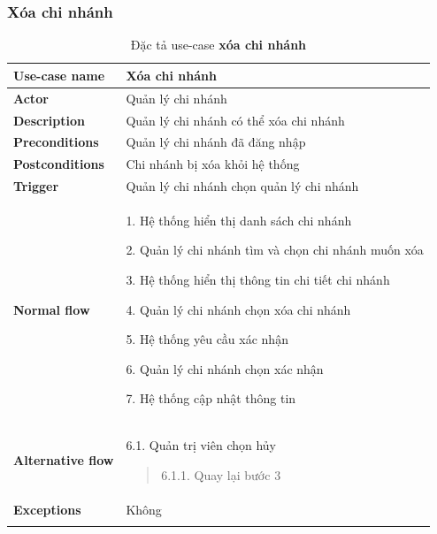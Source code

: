 \subsubsection{Xóa chi nhánh}
{
    \setlength\extrarowheight{6pt}
    \begin{longtable}{| p{} | p{} |}
        \hline
        \textbf{Use-case name}
         &
        Xóa chi nhánh
        \\
        \hline
        \textbf{Actor}
         &
        Quản lý chi nhánh
        \\
        \hline
        \textbf{Description}
         &
        Quản lý chi nhánh có thể xóa chi nhánh
        \\
        \hline
        \textbf{Preconditions}
         &
        Quản lý chi nhánh đã đăng nhập
        \\
        \hline
        \textbf{Postconditions}
         &
        Chi nhánh bị xóa khỏi hệ thống
        \\
        \hline
        \textbf{Trigger}
         &
        Quản lý chi nhánh chọn quản lý chi nhánh
        \\
        \hline
        \begin{flushleft}
            \textbf{Normal flow}
        \end{flushleft}
         &
        1. Hệ thống hiển thị danh sách chi nhánh

        2. Quản lý chi nhánh tìm và chọn chi nhánh muốn xóa

        3. Hệ thống hiển thị thông tin chi tiết chi nhánh

        4. Quản lý chi nhánh chọn xóa chi nhánh

        5. Hệ thống yêu cầu xác nhận

        6. Quản lý chi nhánh chọn xác nhận

        7. Hệ thống cập nhật thông tin
        \\
        \hline
        \begin{flushleft}
            \textbf{Alternative flow}
        \end{flushleft}
         &
        6.1. Quản trị viên chọn hủy
        \begin{quote}
            6.1.1. Quay lại bước 3
        \end{quote}
        \\
        \hline
        \textbf{Exceptions}
         &
        Không
        \\
        \hline
        \caption{Đặc tả use-case \textbf{xóa chi nhánh}}
    \end{longtable}
}

